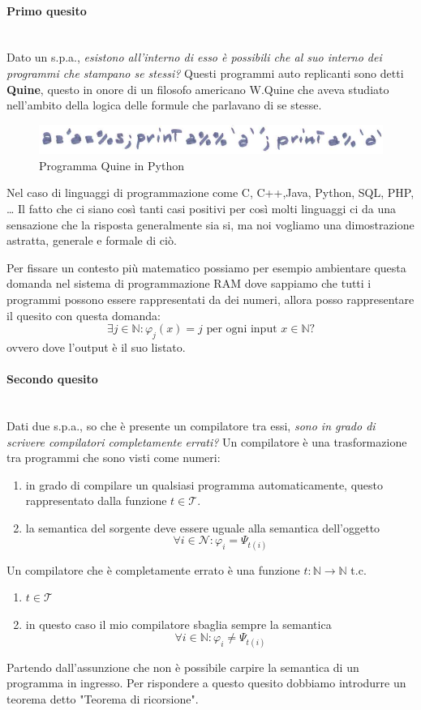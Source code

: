 \documentclass{article}
\begin{document}
\paragraph{Primo quesito}\mbox{}\\
Dato un s.p.a., \textit{esistono all'interno di esso è possibili che al suo interno dei programmi
    che stampano se stessi?} Questi programmi auto replicanti sono detti \textbf{Quine}, questo in onore
di un filosofo americano W.Quine che aveva studiato nell'ambito della logica delle formule che
parlavano di se stesse.
\begin{figure}[H]
    \centering
    \includegraphics[scale=0.5]{images/python.png}
    \caption{Programma Quine in Python}
\end{figure}
Nel caso di linguaggi di programmazione come C, C++,Java, Python, SQL, PHP, \dots
Il fatto che ci siano così tanti casi positivi per così molti linguaggi ci da una sensazione
che la risposta generalmente sia si, ma noi vogliamo una dimostrazione astratta, generale e
formale di ciò.

Per fissare un contesto più matematico possiamo per esempio ambientare questa domanda nel
sistema di programmazione RAM dove sappiamo che tutti i programmi possono essere rappresentati
da dei numeri, allora posso rappresentare il quesito con questa domanda:
$$\exists j\in\mathbb{N}:\varphi_j(x)=j\text{ per ogni input }x\in\mathbb{N}?$$
ovvero dove l'output è il suo listato.

\paragraph{Secondo quesito}\mbox{}\\
Dati due s.p.a., so che è presente un compilatore tra essi, \textit{sono in grado di scrivere
    compilatori completamente errati?} Un compilatore è una trasformazione tra programmi che sono
visti come numeri:
\begin{enumerate}
    \item in grado di compilare un qualsiasi programma automaticamente, questo rappresentato
          dalla funzione $t\in\mathcal{T}$.
    \item la semantica del sorgente deve essere uguale alla semantica dell'oggetto
          $$\forall i\in\mathcal{N}:\varphi_i=\Psi_{t(i)}$$
\end{enumerate}
Un compilatore che è completamente errato è una funzione $t:\mathbb{N}\rightarrow\mathbb{N}$ t.c.
\begin{enumerate}
    \item $t\in\mathcal{T}$
    \item in questo caso il mio compilatore sbaglia sempre la semantica
          $$\forall i\in\mathbb{N}:\varphi_i\neq\Psi_{t(i)}$$
\end{enumerate}
Partendo dall'assunzione che non è possibile carpire la semantica di un programma in ingresso.
Per rispondere a questo quesito dobbiamo introdurre un teorema detto "Teorema di ricorsione".
\end{document}
